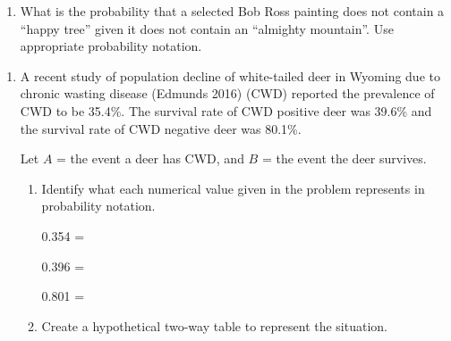 \documentclass[
]{report}
\providecommand{\tightlist}{%
  \setlength{\itemsep}{0pt}\setlength{\parskip}{0pt}}
\begin{document}
\vspace{0.5in}

\begin{enumerate}
\def\labelenumi{\alph{enumi}.}
\setcounter{enumi}{2}
\tightlist
\item
  What is the probability that a selected Bob Ross painting does not contain a ``happy tree'' given it does not contain an ``almighty mountain''. Use appropriate probability notation.
\end{enumerate}

\vspace{0.55in}

\newpage

\begin{enumerate}
\def\labelenumi{\arabic{enumi}.}
\setcounter{enumi}{1}
\item
  A recent study of population decline of white-tailed deer in Wyoming due to chronic wasting disease (Edmunds 2016) (CWD) reported the prevalence of CWD to be 35.4\%. The survival rate of CWD positive deer was 39.6\% and the survival rate of CWD negative deer was 80.1\%.\\
  \vspace{1mm}

  Let \(A\) = the event a deer has CWD, and \(B\) = the event the deer survives.
  \vspace{0.1in}

  \begin{enumerate}
  \def\labelenumii{\alph{enumii}.}
  \item
    Identify what each numerical value given in the problem represents in probability notation.
    \vspace{.1in}

    0.354 =\\
    \vspace{.1in}

    0.396 =\\
    \vspace{.1in}

    0.801 =\\
    \vspace{.1in}
  \item
    Create a hypothetical two-way table to represent the situation.
  \end{enumerate}
\end{enumerate}
\end{document}
